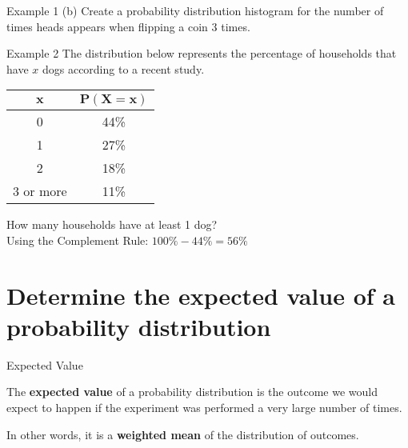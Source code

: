\documentclass[t]{beamer}
\begin{document}
\begin{frame}{Example 1}
(b) \quad Create a probability distribution histogram for the number of times heads appears when flipping a coin 3 times.	\newline\\	\pause

\begin{center}
\end{center}
\end{frame}

\begin{frame}{Example 2}
The distribution below represents the percentage of households that have $x$ dogs according to a recent study. \newline
\begin{center}
\begin{tabular}{c|c}
$\bm{x}$ & $\bm{P(X=x)}$ \\ \hline
0 & 44\% \\
1 & 27\% \\
2 & 18\% \\
3 or more & 11\%
\end{tabular}
\end{center}
How many households have at least 1 dog?	\newline\\	\pause
Using the Complement Rule: $100\% - 44\% = 56\%$
\end{frame}

\section{Determine the expected value of a probability distribution}

\begin{frame}{Expected Value}
\begin{tcolorbox}[colframe=green!20!black, colback = green!30!white,title=\textbf{Expected Value}]
The \textbf{expected value} of a probability distribution is the outcome we would expect to happen if the experiment was performed a very large number of times.
\end{tcolorbox}
\vspace{10pt} \pause

In other words, it is a {\color{blue}\textbf{weighted mean}} of the distribution of outcomes.
\end{frame}
\end{document}
